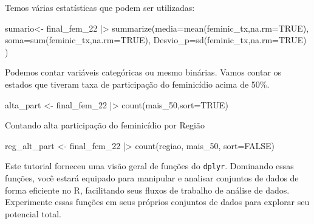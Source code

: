 \documentclass[
  letterpaper,
  DIV=11,
  numbers=noendperiod]{scrreprt}
\newenvironment{Shaded}{\begin{snugshade}}{\end{snugshade}}
\newcommand{\AttributeTok}[1]{\textcolor[rgb]{0.40,0.45,0.13}{#1}}
\newcommand{\ConstantTok}[1]{\textcolor[rgb]{0.56,0.35,0.01}{#1}}
\newcommand{\FunctionTok}[1]{\textcolor[rgb]{0.28,0.35,0.67}{#1}}
\newcommand{\NormalTok}[1]{\textcolor[rgb]{0.00,0.23,0.31}{#1}}
\newcommand{\OtherTok}[1]{\textcolor[rgb]{0.00,0.23,0.31}{#1}}
\newcommand{\SpecialCharTok}[1]{\textcolor[rgb]{0.37,0.37,0.37}{#1}}
\begin{document}
Temos várias estatísticas que podem ser utilizadas:

\begin{Shaded}
\begin{Highlighting}[]
\NormalTok{sumario}\OtherTok{\textless{}{-}}\NormalTok{ final\_fem\_22 }\SpecialCharTok{|\textgreater{}} 
  \FunctionTok{summarize}\NormalTok{(}\AttributeTok{media=}\FunctionTok{mean}\NormalTok{(feminic\_tx,}\AttributeTok{na.rm=}\ConstantTok{TRUE}\NormalTok{),}
            \AttributeTok{soma=}\FunctionTok{sum}\NormalTok{(feminic\_tx,}\AttributeTok{na.rm=}\ConstantTok{TRUE}\NormalTok{),}
            \AttributeTok{Desvio\_p=}\FunctionTok{sd}\NormalTok{(feminic\_tx,}\AttributeTok{na.rm=}\ConstantTok{TRUE}\NormalTok{)}
\NormalTok{            )}
\end{Highlighting}
\end{Shaded}

Podemos contar variáveis categóricas ou mesmo binárias. Vamos contar os
estados que tiveram taxa de participação do feminicídio acima de 50\%.

\begin{Shaded}
\begin{Highlighting}[]
\NormalTok{alta\_part }\OtherTok{\textless{}{-}}\NormalTok{ final\_fem\_22 }\SpecialCharTok{|\textgreater{}} 
  \FunctionTok{count}\NormalTok{(mais\_50,}\AttributeTok{sort=}\ConstantTok{TRUE}\NormalTok{)}
\end{Highlighting}
\end{Shaded}

Contando alta participação do feminicídio por Região

\begin{Shaded}
\begin{Highlighting}[]
\NormalTok{reg\_alt\_part }\OtherTok{\textless{}{-}}\NormalTok{ final\_fem\_22 }\SpecialCharTok{|\textgreater{}} 
  \FunctionTok{count}\NormalTok{(regiao, mais\_50, }\AttributeTok{sort=}\ConstantTok{FALSE}\NormalTok{)}
\end{Highlighting}
\end{Shaded}

Este tutorial forneceu uma visão geral de funções do \texttt{dplyr}.
Dominando essas funções, você estará equipado para manipular e analisar
conjuntos de dados de forma eficiente no R, facilitando seus fluxos de
trabalho de análise de dados. Experimente essas funções em seus próprios
conjuntos de dados para explorar seu potencial total.

\end{document}
